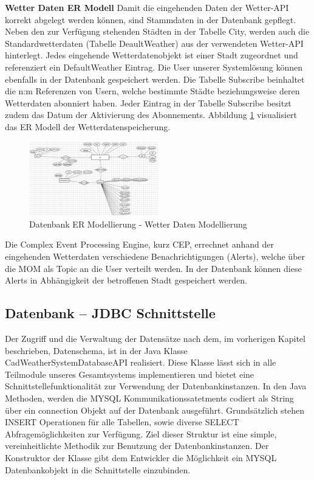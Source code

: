 \textbf{Wetter Daten ER Modell}
Damit die eingehenden Daten der Wetter-API  korrekt abgelegt werden können, sind Stammdaten in der Datenbank gepflegt. Neben den zur Verfügung stehenden Städten in der Tabelle City, werden auch die Standardwetterdaten (Tabelle DeaultWeather) aus der verwendeten Wetter-API hinterlegt. Jedes eingehende  Wetterdatenobjekt ist einer Stadt zugeordnet und referenziert ein DefaultWeather Eintrag.
Die User unserer Systemlösung können ebenfalls in der Datenbank gespeichert werden. Die Tabelle Subscribe beinhaltet die n:m Referenzen von Usern, welche bestimmte Städte beziehungsweise deren Wetterdaten abonniert haben. Jeder Eintrag in der Tabelle Subscribe besitzt zudem das Datum der Aktivierung des Abonnements. Abbildung \ref{img:DBSchemaWetterDaten} visualisiert das ER Modell der Wetterdatenspeicherung.
\begin{figure}[htbp]
	\centering
	\includegraphics[width=0.5\textwidth]{Bilder/DBWetterDaten.png}
	\caption{Datenbank ER Modellierung - Wetter Daten Modellierung}
	\label{img:DBSchemaWetterDaten}
\end{figure} 
Die Complex Event Processing Engine, kurz CEP, errechnet anhand der eingehenden Wetterdaten verschiedene Benachrichtigungen (Alerts), welche über die MOM als Topic an die User verteilt werden. In der Datenbank können diese Alerts in Abhängigkeit der betroffenen Stadt gespeichert werden.

\subsection{Datenbank – JDBC Schnittstelle}
Der Zugriff und die Verwaltung der Datensätze nach dem, im vorherigen Kapitel beschrieben, Datenschema, ist in der Java Klasse CadWeatherSystemDatabaseAPI realisiert. Diese Klasse lässt sich in alle Teilmodule unseres Gesamtsystems implementieren und bietet eine Schnittstellefunktionalität zur Verwendung der Datenbankinstanzen. In den Java Methoden, werden die MYSQL Kommunikationssatetments codiert als String über ein connection Objekt auf der Datenbank ausgeführt. Grundsätzlich stehen INSERT Operationen für alle Tabellen, sowie diverse SELECT Abfragemöglichkeiten zur Verfügung. Ziel dieser Struktur ist eine simple, vereinheitlichte Methodik zur Benutzung der Datenbankinstanzen.
Der Konstruktor der Klasse gibt dem Entwickler die Möglichkeit ein MYSQL Datenbankobjekt in die Schnittstelle einzubinden.

